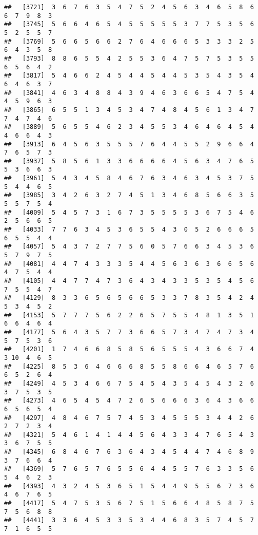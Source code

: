 \documentclass[
]{book}
\begin{document}
\begin{verbatim}
##   [3721]  3  6  7  6  3  5  4  7  5  2  4  5  6  3  4  6  5  8  6  6  7  9  8  3
##   [3745]  5  6  6  4  6  5  4  5  5  5  5  5  3  7  7  5  3  5  6  5  2  5  5  7
##   [3769]  5  6  6  5  6  6  2  7  6  4  6  6  6  5  3  3  3  2  5  6  4  3  5  8
##   [3793]  8  8  6  5  5  4  2  5  5  3  6  4  7  5  7  5  3  5  5  6  5  6  4  2
##   [3817]  5  4  6  6  2  4  5  4  4  5  4  4  5  3  5  4  3  5  4  6  4  6  3  7
##   [3841]  4  6  3  4  8  8  4  3  9  4  6  3  6  6  5  4  7  5  4  4  5  9  6  3
##   [3865]  6  5  5  1  3  4  5  3  4  7  4  8  4  5  6  1  3  4  7  7  4  7  4  6
##   [3889]  5  6  5  5  4  6  2  3  4  5  5  3  4  6  4  6  4  5  4  4  6  6  4  3
##   [3913]  6  4  5  6  3  5  5  5  7  6  4  4  5  5  2  9  6  6  4  7  6  5  7  3
##   [3937]  5  8  5  6  1  3  3  6  6  6  6  4  5  6  3  4  7  6  5  5  3  6  6  3
##   [3961]  5  4  3  4  5  8  4  6  7  6  3  4  6  3  4  5  3  7  5  5  4  4  6  5
##   [3985]  3  4  2  6  3  2  7  4  5  1  3  4  6  8  5  6  6  3  5  5  5  7  5  4
##   [4009]  5  4  5  7  3  1  6  7  3  5  5  5  5  3  6  7  5  4  6  2  5  6  6  5
##   [4033]  7  7  6  3  4  5  3  6  5  5  4  3  0  5  2  6  6  6  5  6  5  5  4  4
##   [4057]  5  4  3  7  2  7  7  5  6  0  5  7  6  6  3  4  5  3  6  5  7  9  7  5
##   [4081]  4  4  7  4  3  3  3  5  4  4  5  6  3  6  3  6  6  5  6  4  7  5  4  4
##   [4105]  4  4  7  7  4  7  3  6  4  3  4  3  3  5  3  5  4  5  6  7  5  5  4  7
##   [4129]  8  3  3  6  5  6  5  6  6  5  3  3  7  8  3  5  4  2  4  5  3  4  5  2
##   [4153]  5  7  7  7  5  6  2  2  6  5  7  5  5  4  8  1  3  5  1  6  6  4  6  4
##   [4177]  5  6  4  3  5  7  7  3  6  6  5  7  3  4  7  4  7  3  4  5  7  5  3  6
##   [4201]  1  7  4  6  6  8  5  8  5  6  5  5  5  4  3  6  6  7  4  3 10  4  6  5
##   [4225]  8  5  3  6  4  6  6  6  8  5  5  8  6  6  4  6  5  7  6  6  5  2  6  4
##   [4249]  4  5  3  4  6  6  7  5  4  5  4  3  5  4  5  4  3  2  6  3  7  5  3  5
##   [4273]  4  6  5  4  5  4  7  2  6  5  6  6  6  3  6  4  3  6  6  6  5  6  5  4
##   [4297]  4  8  4  6  7  5  7  4  5  3  4  5  5  5  3  4  4  2  6  2  7  2  3  4
##   [4321]  5  4  6  1  4  1  4  4  5  6  4  3  3  4  7  6  5  4  3  3  6  7  5  5
##   [4345]  6  8  4  6  7  6  3  6  4  3  4  5  4  4  7  4  6  8  9  3  7  6  6  4
##   [4369]  5  7  6  5  7  6  5  5  6  4  4  5  5  7  6  3  3  5  6  5  4  6  2  3
##   [4393]  4  3  2  4  5  3  6  5  1  5  4  4  9  5  5  6  7  3  6  4  6  7  6  5
##   [4417]  5  4  7  5  3  5  6  7  5  1  5  6  6  4  8  5  8  7  5  7  5  6  8  8
##   [4441]  3  3  6  4  5  3  3  5  3  4  4  6  8  3  5  7  4  5  7  7  1  6  5  5

\end{verbatim}
\end{document}
